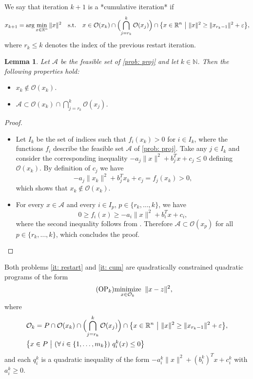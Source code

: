\documentclass[12pt]{amsart}
\theoremstyle{plain}
\newtheorem{lemma}[theorem]{Lemma}
\theoremstyle{definition}
\newcommand{\minimize}[2]{\ensuremath{\underset
		{\substack{{#1}}}%
		{\text{\rm minimize}}\;\;#2 }}
\newcommand{\OAP}{ \mathcal{O}}
\begin{document}
We say that iteration \(k+1\) is a *cumulative iteration* if
\begin{equation}
\label{it: cum}
x_{k+1} = \arg\min_{x \in \mathbb{R}^n} \|x\|^2 
\quad \text{s.t.} \quad 
x \in \mathcal{O}(x_k) \cap \Bigl( \bigcap_{j=r_k}^k \mathcal{O}(x_j) \Bigr) 
\cap \bigl\{ x \in \mathbb{R}^n \ \big|\ \|x\|^2 \ge \|x_{r_k-1}\|^2 + \varepsilon \bigr\},
\end{equation}
where \(r_k \le k\) denotes the index of the previous restart iteration.

\begin{lemma}
\label{lem: again}
Let \(\mathcal{A}\) be the feasible set of \eqref{prob: proj} and let \(k \in \mathbb{N}\). Then the following properties hold:
\begin{itemize}
    \item \(x_k \notin \mathcal{O}(x_k)\).
    \item \(\mathcal{A} \subset \mathcal{O}(x_k) \cap \bigcap_{j=r_k}^k \mathcal{O}(x_j)\).
\end{itemize}
\end{lemma}

\begin{proof}
\begin{itemize}
    \item Let \(I_k\) be the set of indices such that \(f_i(x_k) > 0\) for \(i \in I_k\), where the functions \(f_i\) describe the feasible set \(\mathcal{A}\) of \eqref{prob: proj}. Take any \(j \in I_k\) and consider the corresponding inequality \(-a_j \|x\|^2 + b_j^T x + c_j \le 0\) defining \(\mathcal{O}(x_k)\). By definition of \(c_j\) we have
    \[
    -a_j \|x_k\|^2 + b_j^T x_k + c_j = f_j(x_k) > 0,
    \]
    which shows that \(x_k \notin \mathcal{O}(x_k)\).

    \item For every \(x \in \mathcal{A}\) and every \(i \in I_p\), \(p \in \{r_k, \dots, k\}\), we have
    \[
    0 \ge f_i(x) \ge -a_i \|x\|^2 + b_i^T x + c_i,
    \]
    where the second inequality follows from \cite[Lemma 2]{bednarczuk2026outer}. Therefore \(\mathcal{A} \subset \mathcal{O}(x_p)\) for all \(p \in \{r_k, \dots, k\}\), which concludes the proof.
\end{itemize}
\end{proof}

Both problems \eqref{it: restart} and \eqref{it: cum} are quadratically constrained quadratic programs of the form
\begin{equation}
\label{outerproblem}
\tag{OP$_k$}
\minimize{x \in \OAP_k} \|x - z\|^2,
\end{equation}
where
\begin{equation}
\label{oaaset0}
\begin{split}
    &\OAP_k = P\cap \mathcal{O}(x_k) \cap \Bigl( \bigcap_{j=r_k}^k \mathcal{O}(x_j) \Bigr) 
\cap \bigl\{ x \in \mathbb{R}^n \ \big|\ \|x\|^2 \ge \|x_{r_k-1}\|^2 + \varepsilon \bigr\},\\
    &\bigl\{ x \in P \ \big|\ 
(\forall\, i \in \{1, \dots, m_k\})\ q_i^k(x) \le 0 \bigr\}
\end{split}
\end{equation}
and each \(q_i^k\) is a quadratic inequality of the form \(-a_i^k \|x\|^2 + (b_i^k)^T x + c_i^k\) with \(a_i^k \ge 0\).
\end{document}
